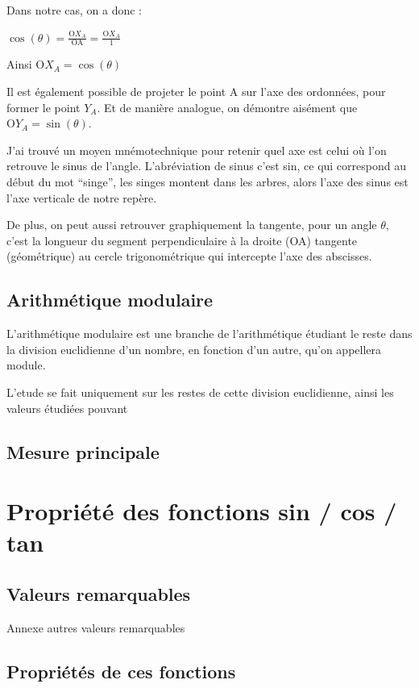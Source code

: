 \documentclass[a4paper]{article}
\begin{document}
			Dans notre cas, on a donc :

			$\cos(\theta) = \frac{\text{O}X_A}{\text{OA}} = \frac{\text{O}X_A}{1}$

			Ainsi $\text{O}X_A = \cos(\theta)$

			Il est également possible de projeter le point A sur l'axe des ordonnées, pour former le point $Y_A$. Et de manière analogue, on démontre aisément que $\text{O}Y_A = \sin(\theta)$.

			J'ai trouvé un moyen mnémotechnique pour retenir quel axe est celui où l'on retrouve le sinus de l'angle. L'abréviation de sinus c'est sin, ce qui correspond au début du mot “singe”, les singes montent dans les arbres, alors l'axe des sinus est l'axe verticale de notre repère.

			De plus, on peut aussi retrouver graphiquement la tangente, pour un angle $\theta$, c'est la longueur du segment perpendiculaire à la droite (OA) tangente (géométrique) au cercle trigonométrique qui intercepte l'axe des abscisses.

		\subsection{Arithmétique modulaire}

			L'arithmétique modulaire est une branche de l'arithmétique étudiant le reste dans la division euclidienne d'un nombre, en fonction d'un autre, qu'on appellera module. 

			L'etude se fait uniquement sur les restes de cette division euclidienne, ainsi les valeurs étudiées pouvant 

		\subsection{Mesure principale}

	\section{Propriété des fonctions sin / cos / tan}

		\subsection{Valeurs remarquables}

			Annexe autres valeurs remarquables 

		\subsection{Propriétés de ces fonctions}
\end{document}

